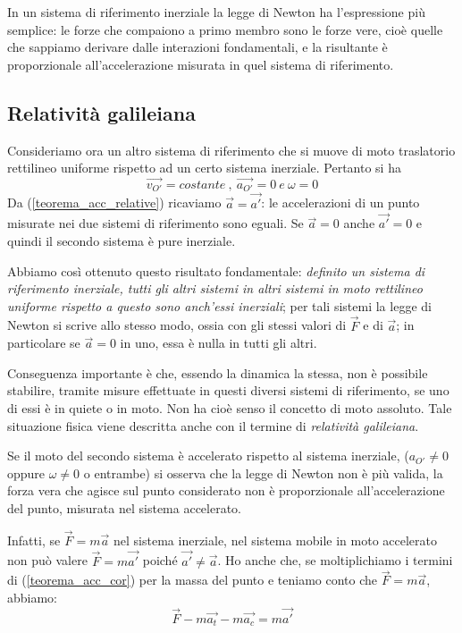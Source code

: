 \documentclass[class=book, crop=false, oneside, 12pt]{standalone}
\begin{document}
In un sistema di riferimento inerziale la legge di Newton ha l'espressione più semplice: 
le forze che compaiono a primo membro sono le forze vere, cioè quelle che sappiamo derivare dalle interazioni fondamentali, e la risultante è proporzionale all'accelerazione misurata in quel sistema di riferimento. 

\subsection{Relatività galileiana}

Consideriamo ora un altro sistema di riferimento che si muove di moto traslatorio rettilineo uniforme rispetto ad un certo sistema inerziale. 
Pertanto si ha 
\begin{equation}
    \overrightarrow{v_{O'}} = costante \ , \ \overrightarrow{a_{O'}} = 0 \ e \ \omega = 0
\end{equation}
Da (\ref{teorema_acc_relative}) ricaviamo \(\overrightarrow{a} = \overrightarrow{a'}\): le accelerazioni di un punto misurate nei due sistemi di riferimento sono eguali. 
Se \(\overrightarrow{a} = 0\) anche \(\overrightarrow{a'}= 0\) e quindi il secondo sistema è pure inerziale. 

Abbiamo così ottenuto questo risultato fondamentale: \emph{definito un sistema di riferimento inerziale, tutti gli altri sistemi in altri sistemi in moto rettilineo uniforme rispetto a questo sono anch'essi inerziali};
per tali sistemi la legge di Newton si scrive allo stesso modo, ossia con gli stessi valori di \(\overrightarrow{F}\) e di \(\overrightarrow{a}\); in particolare se \(\overrightarrow{a} = 0\) in uno, essa è nulla in tutti gli altri.

Conseguenza importante è che, essendo la dinamica la stessa, non è possibile stabilire, tramite misure effettuate in questi diversi sistemi di riferimento, se uno di essi è in quiete o in moto. 
Non ha cioè senso il concetto di moto assoluto. 
Tale situazione fisica viene descritta anche con il termine di \emph{relatività galileiana}.

Se il moto del secondo sistema è accelerato rispetto al sistema inerziale, (\(a_{O'} \neq 0\) oppure \(\omega \neq 0\) o entrambe) si osserva che la legge di Newton non è più valida, la forza vera che agisce sul punto considerato non è proporzionale all'accelerazione del punto, misurata nel sistema accelerato.

Infatti, se \(\overrightarrow{F} = m \overrightarrow{a}\) nel sistema inerziale, nel sistema mobile in moto accelerato non può valere \(\overrightarrow{F} = m \overrightarrow{a'}\) poiché \( \overrightarrow{a'} \neq \overrightarrow{a}\).
Ho anche che, se moltiplichiamo i termini di (\ref{teorema_acc_cor}) per la massa del punto e teniamo conto che \(\overrightarrow{F} = m \overrightarrow{a}\), abbiamo:
\begin{equation} \label{f_rel}
    \overrightarrow{F} - m \overrightarrow{a_t} - m \overrightarrow{a_c} = m \overrightarrow{a'}
\end{equation}
\end{document}
